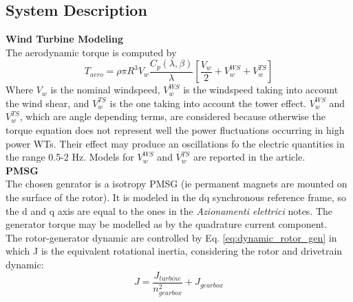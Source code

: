 \documentclass[]{article}
\begin{document}
\subsection{System Description}
\textbf{Wind Turbine Modeling}\\
The aerodynamic torque is computed by
\begin{equation}
	T_{aero} = \rho \pi R^3 V_w \frac{C_p(\lambda, \beta)}{\lambda}\left[\frac{V_w}{2} + V_w^{WS} + V_w^{TS}\right]
\end{equation}
Where $V_w$ is the nominal windspeed, $V_w^{WS}$ is the windspeed taking into account the wind shear, and $V_w^{TS}$ is the one taking into account the tower effect. $V_w^{WS}$ and $V_w^{TS}$, which are angle depending terms, are considered because otherwise the torque equation does not represent well the power fluctuations occurring in high power WTs. Their effect may produce an oscillations fo the electric quantities in the range 0.5-2 Hz. Models for $V_w^{WS}$ and $V_w^{TS}$ are reported in the article. \\
\textbf{PMSG}\\
The chosen genrator is a isotropy PMSG (ie permanent magnets are mounted on the surface of the rotor). It is modeled in the dq synchronous reference frame, so the d and q axis are equal to the ones in the \textit{Azionamenti elettrici} notes. The generator torque may be modelled as by the quadrature current component. \\
The rotor-generator dynamic are controlled by Eq. \ref{eq:dynamic_rotor_gen} in which J is the equivalent rotational inertia, considering the rotor and drivetrain dynamic:
\begin{equation}
	J = \frac{J_{turbine}}{n_{gearbox}^2} + J_{gearbox}
\end{equation}
\end{document}
